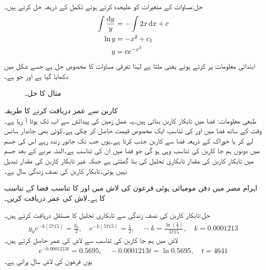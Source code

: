 حل:مساوات کے متغیرات کو علیحدہ کرتے ہوئے تکمل کے ذریعہ حل کرتے ہیں۔
\begin{align*}
\int\frac{\dif y}{y}&=-\int 2x \dif x+c\\
\ln y&=-x^{2}+c_1\\
y&=ce^{-x^2}
\end{align*}
ابتدائی معلومات پر کرتے ہوئے  یعنی  ملتا ہے لہٰذا تفرقی مساوات کا مخصوص حل  ہے جسے شکل  میں دکھایا گیا ہے اور جو  ہے۔
\begin{figure}
\centering
{}
\caption{مثال  کا  حل۔}
\label{شکل_مثال_سادہ_اول_گھنٹی_الف}
\end{figure}
\quad کاربن سے عمر دریافت کرنے کا طریقہ\\
طبعی معلومات:  فضا میں تابکار کاربن  بناتی ہیں۔یہ عمل زمین کی پیدائش سے اب تک ہوتا آ رہا ہے۔وقت کے ساتھ فضا میں  اور  کی تناسب ایک مخصوص قیمت حاصل کر چکی ہے۔کوئی بھی جاندار سانس لے کر یا خوراک کے ذریعہ فضا سے کاربن جذب  کرتا ہے۔یوں جب تک جانور زندہ رہے اس کی جسم میں دونوں ہم جا کاربن کی تناسب وہی ہو گی جو فضا میں ان کی تناسب ہے۔البتہ مرنے کے بعد جسم میں تابکار کاربن کی مقدار تابکاری تحلیل کی بنا گھٹتی ہے جبکہ غیر تابکار کاربن کی مقدار تبدیل نہیں ہوتی۔تابکار کاربن  کی نصف زندگی  سال ہے۔

اہرام مصر میں دفن مومیائی ہوئی فرعون کی لاش میں  اور  کا تناسب فضا کے تناسب کا  ہے۔لاش کی عمر دریافت کریں۔

حل:تابکار کاربن کی نصف زندگی سے تابکاری تحلیل کا مستقل  دریافت کرتے ہیں۔
\begin{align*}
y_0e^{-k(5715)}=\frac{y_0}{2}, \quad e^{-k(5715)}=\frac{1}{2}, \quad -k=\frac{\ln (\frac{1}{2})}{5715}, \quad k=0.0001213
\end{align*}
لاش میں ہم جا کاربن کی تناسب سے لاش کی عمر حاصل کرتے ہیں۔
\begin{align*}
e^{-0.0001213t}=0.5695,\quad -0.0001213t=\ln 0.5695,\quad t=4641
\end{align*}
یوں فرعون کی لاش  سال پرانی ہے۔

